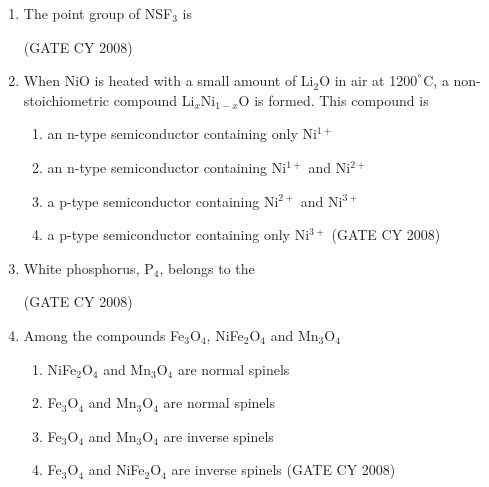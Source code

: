 \documentclass[12pt]{article}
\begin{document}
\begin{enumerate}
\item The point group of NSF$_3$ is
\begin{enumerate}
    \hfill{(GATE CY 2008)}
\end{enumerate}

\item When NiO is heated with a small amount of Li$_2$O in air at 1200$^\degree$C, a non-stoichiometric compound Li$_x$Ni$_{1-x}$O is formed. This compound is
\begin{enumerate}
\item  an n-type semiconductor containing only Ni$^{1+}$
\item an n-type semiconductor containing Ni$^{1+}$ and Ni$^{2+}$
\item a p-type semiconductor containing Ni$^{2+}$ and Ni$^{3+}$
\item a p-type semiconductor containing only Ni$^{3+}$    \hfill{(GATE CY 2008)}
\end{enumerate}
\degree




\item White phosphorus, P$_4$, belongs to the
\begin{enumerate}
  \hfill{(GATE CY 2008)}
\end{enumerate}

\item Among the compounds Fe$_3$O$_4$, NiFe$_2$O$_4$ and Mn$_3$O$_4$
\begin{enumerate}
\item NiFe$_2$O$_4$ and Mn$_3$O$_4$ are normal spinels
\item Fe$_3$O$_4$ and Mn$_3$O$_4$ are normal spinels
\item Fe$_3$O$_4$ and Mn$_3$O$_4$ are inverse spinels
\item Fe$_3$O$_4$ and NiFe$_2$O$_4$ are inverse spinels    \hfill{(GATE CY 2008)}
\end{enumerate}


\end{enumerate}
\end{document}
